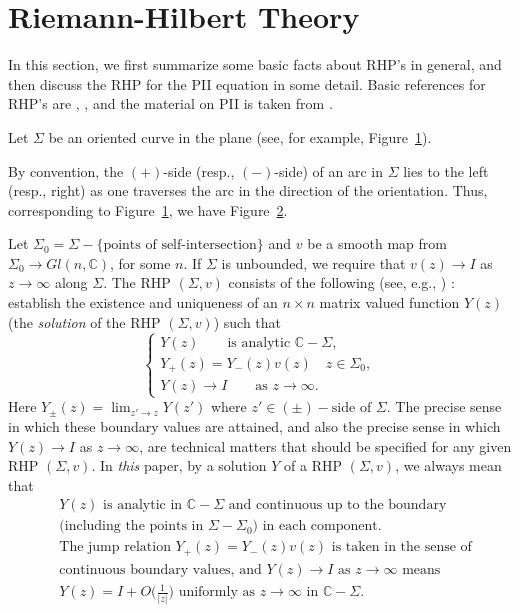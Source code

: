 \documentclass{amsart}
\theoremstyle{definition}
\theoremstyle{remark}
\numberwithin{equation}{section}
\newcommand{\C}{\mathbb C}
\begin{document}


\section{{\bf Riemann-Hilbert Theory}}
\label{s-PII}

In this section, we first summarize some basic facts about RHP's in general,   
and then discuss the RHP for the PII equation in some detail.
Basic references for RHP's are \cite{CG}, \cite{GK}, and 
the material on PII is taken from \cite{DZ}.

\medskip
Let $\Sigma$ be an oriented curve in the plane (see, 
for example, Figure~\ref{fig-rh1}).
\begin{figure}[ht]
 \centerline{}
 \caption{}\label{fig-rh1}
\end{figure}
By convention, the $(+)$-side (resp., $(-)$-side) of an arc in $\Sigma$ 
lies to the left (resp., right) as one traverses the arc in the direction 
of the orientation.
Thus, corresponding to Figure~\ref{fig-rh1}, we have Figure~\ref{fig-rh2}.
\begin{figure}[ht]
 \centerline{}
 \caption{}\label{fig-rh2}
\end{figure}
Let $\Sigma_0=\Sigma-\{\text{points of self-intersection}\}$ and $v$ 
be a smooth map from $\Sigma_0\to Gl(n,\C)$, for some $n$.
If $\Sigma$ is unbounded, we require that $v(z)\to I$ as $z\to\infty$ 
along $\Sigma$.
The RHP $(\Sigma,v)$ consists of the following (see, e.g., \cite{CG}) : 
establish the existence and uniqueness of an $n\times n$ matrix valued 
function $Y(z)$ (the \emph{solution} of the RHP $(\Sigma,v)$) 
such that 
\begin{equation}\label{e-tec1}
  \begin{cases}
     Y(z) \qquad\text{is analytic $\C-\Sigma$,}\\
     Y_+(z)=Y_-(z)v(z) \quad z\in\Sigma_0,\\
     Y(z)\to I \qquad\text{as $z\to\infty$.}
  \end{cases}
\end{equation}
Here $Y_{\pm}(z)=\lim_{z'\to z}Y(z')$ where 
$z'\in (\pm)-\text{side of $\Sigma$}$.
The precise sense in which these boundary values are attained, and also 
the precise sense in which $Y(z)\to I$ as $z\to\infty$, are 
technical matters 
that should be specified for any given RHP $(\Sigma,v)$. 
In \emph{this} paper, by a solution $Y$ of a RHP $(\Sigma,v)$, we always mean 
that 
\begin{equation}\label{e-tec2}
  \begin{split}
   &\text{$Y(z)$ is analytic in $\C-\Sigma$ and continuous up to the 
boundary}\\
&\text{(including the points in $\Sigma-\Sigma_0$) in each component.}\\ 
&\text{The jump relation $Y_+(z)=Y_-(z)v(z)$ is taken in the sense of}\\
&\text{continuous boundary values, and $Y(z)\to I$ as $z\to\infty$ means}\\
&\text{$Y(z)=I+O\bigl( \frac1{|z|} \bigr)$ uniformly as 
$z\to\infty$ in $\C-\Sigma$.}
  \end{split}
\end{equation}
\end{document}
